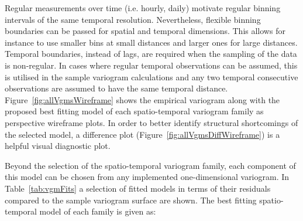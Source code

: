 Regular measurements over time (i.e. hourly, daily) motivate regular binning intervals of the same temporal resolution. Nevertheless, flexible binning boundaries can be passed for spatial and temporal dimensions. This allows for instance to use smaller bins at small distances and larger ones for large distances. Temporal boundaries, instead of lags, are required when the sampling of the data is non-regular. In cases where regular temporal observations can be assumed, this is utilised in the sample variogram calculations and any two temporal consecutive observations are assumed to have the same temporal distance. Figure~\ref{fig:allVgmsWireframe} shows the empirical variogram along with the proposed best fitting model of each spatio-temporal variogram family as perspective wireframe plots. In order to better identify structural shortcomings of the selected model, a difference plot (Figure~\ref{fig:allVgmsDiffWireframe}) is a helpful visual diagnostic plot.

Beyond the selection of the spatio-temporal variogram family, each component of this model can be chosen from any implemented one-dimensional variogram. In Table~\ref{tab:vgmFits} a selection of fitted models in terms of their residuals compared to the sample variogram surface are shown. The best fitting spatio-temporal model of each family is given as:

